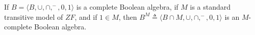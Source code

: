 If $B = \langle B, \cup, \cap, ^-, 0, 1 \rangle$ is a complete Boolean algebra, if $M$ is a standard transitive model of $ZF$, and if $1 \in M$, then $B^M \triangleq \langle B \cap M, \cup, \cap, ^-, 0, 1 \rangle$ is an $M$-complete Boolean algebra.
